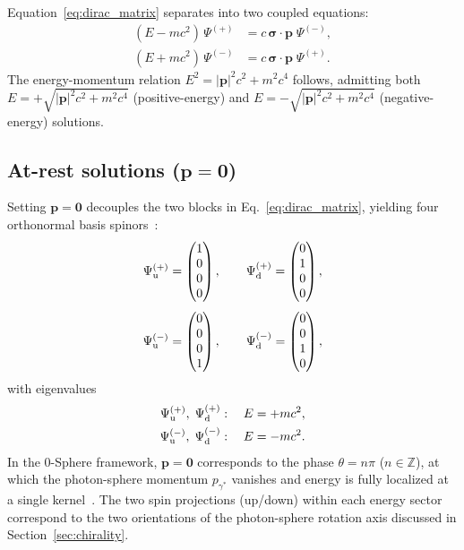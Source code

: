 \documentclass[%
 reprint, amsmath,amssymb, aps, prb, ]{revtex4-2}
\numberwithin{equation}{section}
\newcommand{\iphase}{\theta}
\begin{document}
Equation~\eqref{eq:dirac_matrix} separates into two coupled equations:
\begin{align}
(E - mc^2)\,\Psi^{(+)} &= c\,\boldsymbol{\sigma}\cdot\mathbf{p}\;\Psi^{(-)},\label{eq:coupled_pos}\\
(E + mc^2)\,\Psi^{(-)} &= c\,\boldsymbol{\sigma}\cdot\mathbf{p}\;\Psi^{(+)}.\label{eq:coupled_neg}
\end{align}
The energy-momentum relation $E^2 = |\mathbf{p}|^2c^2 + m^2c^4$ follows, admitting both $E=+\sqrt{|\mathbf{p}|^2c^2+m^2c^4}$ (positive-energy) and $E=-\sqrt{|\mathbf{p}|^2c^2+m^2c^4}$ (negative-energy) solutions.

\subsection{At-rest solutions ($\mathbf{p}=\mathbf{0}$)}
\label{app:atrest}

Setting $\mathbf{p}=\mathbf{0}$ decouples the two blocks in Eq.~\eqref{eq:dirac_matrix}, yielding four orthonormal basis spinors~\cite{Griffiths}:
\begin{align}
\Psi^{(+)}_{\mathrm{u}}
&= \begin{pmatrix}1\\0\\0\\0\end{pmatrix},\qquad
\Psi^{(+)}_{\mathrm{d}}
= \begin{pmatrix}0\\1\\0\\0\end{pmatrix},\notag\\[4pt]
\Psi^{(-)}_{\mathrm{u}}
&= \begin{pmatrix}0\\0\\0\\1\end{pmatrix},\qquad
\Psi^{(-)}_{\mathrm{d}}
= \begin{pmatrix}0\\0\\1\\0\end{pmatrix},
\label{eq:basis_spinors}
\end{align}
with eigenvalues
\begin{align}
\Psi^{(+)}_{\mathrm{u}},\;\Psi^{(+)}_{\mathrm{d}}&:\quad E = +mc^2,\notag\\
\Psi^{(-)}_{\mathrm{u}},\;\Psi^{(-)}_{\mathrm{d}}&:\quad E = -mc^2.
\label{eq:eigenvalues}
\end{align}
In the 0-Sphere framework, $\mathbf{p}=\mathbf{0}$ corresponds to the phase $\iphase = n\pi$ ($n\in\mathbb{Z}$), at which the photon-sphere momentum $p_{\gamma^*}$ vanishes and energy is fully localized at a single kernel~\cite{hanamura07, hanamura01}. The two spin projections (up/down) within each energy sector correspond to the two orientations of the photon-sphere rotation axis discussed in Section~\ref{sec:chirality}.
\end{document}
